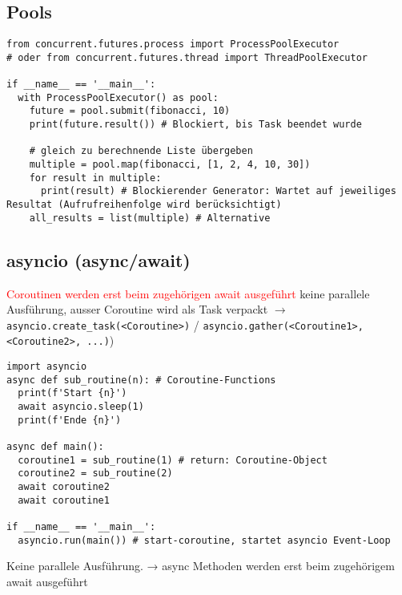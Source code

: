 \subsection{Pools}

\begin{lstlisting}[style=Python]
from concurrent.futures.process import ProcessPoolExecutor
# oder from concurrent.futures.thread import ThreadPoolExecutor

if __name__ == '__main__':
  with ProcessPoolExecutor() as pool:
  	future = pool.submit(fibonacci, 10)
  	print(future.result()) # Blockiert, bis Task beendet wurde

    # gleich zu berechnende Liste übergeben
  	multiple = pool.map(fibonacci, [1, 2, 4, 10, 30])
  	for result in multiple:
  	  print(result) # Blockierender Generator: Wartet auf jeweiliges Resultat (Aufrufreihenfolge wird berücksichtigt)
    all_results = list(multiple) # Alternative
\end{lstlisting}

\subsection{asyncio (async/await)}

\textcolor{red}{Coroutinen werden erst beim zugehörigen await ausgeführt} keine parallele Ausführung, ausser Coroutine wird als Task verpackt $\rightarrow$ \lstinline{asyncio.create_task(<Coroutine>)} / \lstinline{asyncio.gather(<Coroutine1>, <Coroutine2>, ...)})

\begin{lstlisting}[style=Python]
import asyncio
async def sub_routine(n): # Coroutine-Functions
  print(f'Start {n}')
  await asyncio.sleep(1)
  print(f'Ende {n}')

async def main():
  coroutine1 = sub_routine(1) # return: Coroutine-Object
  coroutine2 = sub_routine(2)
  await coroutine2
  await coroutine1

if __name__ == '__main__':
  asyncio.run(main()) # start-coroutine, startet asyncio Event-Loop
\end{lstlisting}
Keine parallele Ausführung. → async
Methoden werden erst beim zugehörigem await ausgeführt


